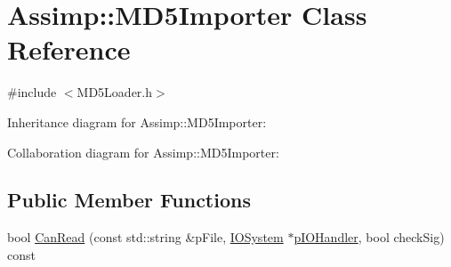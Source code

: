 \hypertarget{class_assimp_1_1_m_d5_importer}{\section{Assimp\+:\+:M\+D5\+Importer Class Reference}
\label{class_assimp_1_1_m_d5_importer}
}


{\ttfamily \#include $<$M\+D5\+Loader.\+h$>$}



Inheritance diagram for Assimp\+:\+:M\+D5\+Importer\+:


Collaboration diagram for Assimp\+:\+:M\+D5\+Importer\+:
\subsection*{Public Member Functions}
\begin{DoxyCompactItemize}
\item 
bool \hyperlink{class_assimp_1_1_m_d5_importer_adc9113079c09de2af26948a58cd4a9df}{Can\+Read} (const std\+::string \&p\+File, \hyperlink{class_assimp_1_1_i_o_system}{I\+O\+System} $\ast$\hyperlink{class_assimp_1_1_m_d5_importer_ad47907df2a104a4130b56b728ccec5ab}{p\+I\+O\+Handler}, bool check\+Sig) const 
\end{DoxyCompactItemize}
